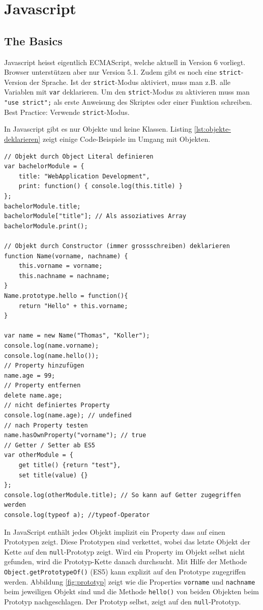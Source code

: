 \chapter{Javascript}

\section{The Basics}

Javascript heisst eigentlich ECMAScript, welche aktuell in Version 6 vorliegt. Browser unterstützen aber nur Version 5.1. Zudem gibt es noch eine \lstinline|strict|-Version der Sprache. Ist der \lstinline|strict|-Modus aktiviert, muss man z.B. alle Variablen mit \lstinline|var| deklarieren. Um den \lstinline|strict|-Modus zu aktivieren muss man \lstinline|"use strict";| als erste Anweisung des Skriptes oder einer Funktion schreiben. Best Practice: Verwende  \lstinline|strict|-Modus. 

In Javascript gibt es nur Objekte und keine Klassen. Listing \ref{lst:objekte-deklarieren} zeigt einige Code-Beispiele im Umgang mit Objekten.

\begin{lstlisting}[label=lst:objekte-deklarieren,caption=Objekte deklarieren]
// Objekt durch Object Literal definieren
var bachelorModule = {
	title: "WebApplication Development",
	print: function() { console.log(this.title) }
};
bachelorModule.title;
bachelorModule["title"]; // Als assoziatives Array
bachelorModule.print();

// Objekt durch Constructor (immer grossschreiben) deklarieren
function Name(vorname, nachname) {
	this.vorname = vorname;
	this.nachname = nachname;
}
Name.prototype.hello = function(){
	return "Hello" + this.vorname;
}

var name = new Name("Thomas", "Koller");
console.log(name.vorname);
console.log(name.hello());
// Property hinzufügen
name.age = 99;
// Property entfernen
delete name.age;
// nicht definiertes Property
console.log(name.age); // undefined
// nach Property testen
name.hasOwnProperty("vorname"); // true
// Getter / Setter ab ES5
var otherModule = {
	get title() {return "test"},
	set title(value) {}
};
console.log(otherModule.title); // So kann auf Getter zugegriffen werden
console.log(typeof a); //typeof-Operator
\end{lstlisting}

In JavaScript enthält jedes Objekt implizit ein Property dass auf einen Prototypen zeigt. Diese Prototypen sind verkettet, wobei das letzte Objekt der Kette auf den \lstinline|null|-Prototyp zeigt. Wird ein Property im Objekt selbst nicht gefunden, wird die Prototyp-Kette danach durchsucht. Mit Hilfe der Methode \lstinline|Object.getPrototypeOf()| (ES5) kann explizit auf den Prototype zugegriffen werden. Abbildung \ref{fig:prototyp} zeigt wie die Properties \lstinline|vorname| und \lstinline|nachname| beim jeweiligen Objekt sind und die Methode \lstinline|hello()| von beiden Objekten beim Prototyp nachgeschlagen. Der Prototyp selbst, zeigt auf den \lstinline|null|-Prototyp.


